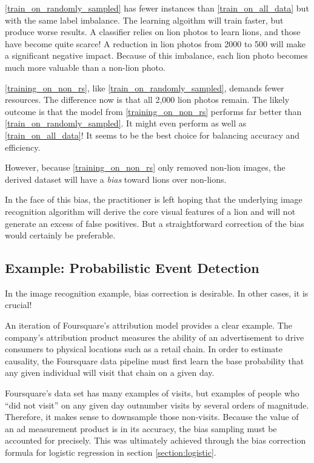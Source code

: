 \documentclass[twoside]{article}
\begin{document}
\ref{train_on_randomly_sampled} has fewer instances than \ref{train_on_all_data} but with the same label imbalance. The learning algoithm will train faster, but produce worse results. A classifier relies on lion photos to learn lions, and those have become quite scarce! A reduction in lion photos from 2000 to 500 will make a significant negative impact. Because of this imbalance, each lion photo becomes much more valuable than a non-lion photo. 

\ref{training_on_non_rs}, like \ref{train_on_randomly_sampled}, demands fewer resources. The difference now is that all 2,000 lion photos remain. The likely outcome is that the model from \ref{training_on_non_rs} performs far better than \ref{train_on_randomly_sampled}. It might even perform as well as \ref{train_on_all_data}! It seems to be the best choice for balancing accuracy and efficiency.

However, because \ref{training_on_non_rs} only removed non-lion images, the derived dataset will have a \textit{bias} toward lions over non-lions. 

In the face of this bias, the practitioner is left hoping that the underlying image recognition algorithm will derive the core visual features of a lion and will not generate an excess of false positives. But a straightforward correction of the bias would certainly be preferable.

\subsection{Example: Probabilistic Event Detection}
\label{section:visit}

In the image recognition example, bias correction is desirable. In other cases, it is crucial!

An iteration of Foursquare’s attribution model\cite{visitprediction} provides a clear example. The company's attribution product measures the ability of an advertisement to drive consumers to physical locations such as a retail chain. In order to estimate causality, the Foursquare data pipeline must first learn the base probability that any given individual will visit that chain on a given day.

Foursquare's data set has many examples of visits, but examples of people who “did not visit” on any given day outnumber visits by several orders of magnitude. Therefore, it makes sense to downsample those non-visits. Because the value of an ad measurement product is in its accuracy, the bias sampling must be accounted for precisely. This was ultimately achieved through the bias correction formula for logistic regression in section \ref{section:logistic}.
\end{document}
